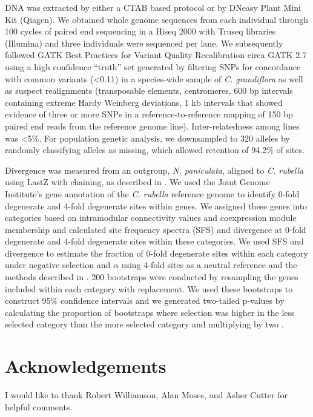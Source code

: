 DNA was extracted by either a CTAB based protocol or by DNeasy Plant Mini Kit (Qiagen). We obtained whole genome sequences from each individual through 100 cycles of paired end sequencing in a Hiseq 2000 with Truseq libraries (Illumina) and three individuals were sequenced per lane. We subsequently followed GATK Best Practices for Variant Quality Recalibration circa GATK 2.7 \citep{DePristo2011-jc} using a high confidence “truth” set generated by filtering SNPs for concordance with common variants (\textless0.11) in a species-wide sample of \textit{C. grandiflora} as well as suspect realignments (transposable elements, centromeres, 600 bp intervals containing extreme Hardy Weinberg deviations, 1 kb intervals that showed evidence of three or more SNPs in a reference-to-reference mapping of 150 bp paired end reads from the reference genome line). Inter-relatedness among lines was \textless 5\%. For population genetic analysis, we downsampled to 320 alleles by randomly classifying alleles as missing, which allowed retention of 94.2\% of sites.

Divergence was measured from an outgroup, \textit{N. paniculata}, aligned to \textit{C. rubella} using LastZ with chaining, as described in \citep{Haudry2013-qe}. We used the Joint Genome Institute’s gene annotation of the \textit{C. rubella} reference genome to identify 0-fold degenerate and 4-fold degenerate sites within genes. We assigned these genes into categories based on intramodular connectivity values and coexpression module membership and calculated site frequency spectra (SFS) and divergence at 0-fold degenerate and 4-fold degenerate sites within these categories.  We used SFS and divergence to estimate the fraction of 0-fold degenerate sites within each category under negative selection and $\alpha$ using 4-fold sites as a neutral reference and the methods described in \citet{Eyre-Walker2009-zt,keightley2007}. 200 bootstraps were conducted by resampling the genes included within each category with replacement. We used these bootstraps to construct 95\% confidence intervals and we generated two-tailed p-values by calculating the proportion of bootstraps where selection was higher in the less selected category than the more selected category and multiplying by two \citep{Eyre-Walker2009-zt}. 



\section{Acknowledgements}
I would like to thank Robert Williamson, Alan Moses, and Asher Cutter for helpful comments.

